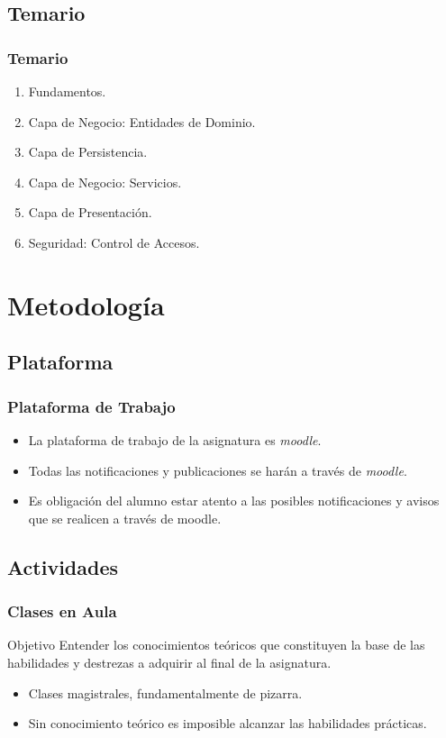 \documentclass[a4paper,t,xcolor=pst,dvips,colortheme]{beamer}
\begin{document}
\subsection{Temario}

\begin{frame}[c]
	\frametitle{Temario}
	\begin{enumerate}
		\item<1-> Fundamentos.
		\item<2-> Capa de Negocio: Entidades de Dominio.
		\item<3-> Capa de Persistencia.
		\item<4-> Capa de Negocio: Servicios.
		\item<5-> Capa de Presentación.
        \item<6-> Seguridad: Control de Accesos.
	\end{enumerate}
\end{frame}

\section{Metodología}

\subsection{Plataforma}

\begin{frame}[c]
	\frametitle{Plataforma de Trabajo}
	\begin{itemize}
		\item<1-> La plataforma de trabajo de la asignatura es \emph{moodle}.
		\item<2-> Todas las notificaciones y publicaciones se harán a través de \emph{moodle}.
		\item<3-> \alert{Es obligación del alumno estar atento a las posibles notificaciones y avisos que se realicen a través de moodle}.
	\end{itemize}
\end{frame}

\subsection{Actividades}

\begin{frame}
	\frametitle{Clases en Aula}
	\begin{block}{Objetivo}
        Entender los conocimientos teóricos que constituyen la base de las habilidades y destrezas a adquirir al final de la asignatura.
	\end{block}
    \begin{itemize}
        \item<2-> Clases magistrales, fundamentalmente de pizarra.
		\item<3-> Sin conocimiento teórico es imposible alcanzar las habilidades prácticas.
	\end{itemize}
\end{frame}
\end{document}
